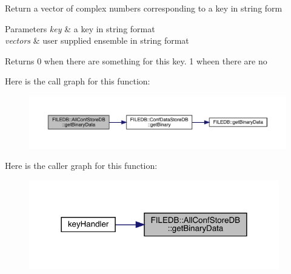 Return a vector of complex numbers corresponding to a key in string form 
\begin{DoxyParams}{Parameters}
{\em key} & a key in string format \\
\hline
{\em vectors} & user supplied ensemble in string format \\
\hline
\end{DoxyParams}
\begin{DoxyReturn}{Returns}
0 when there are something for this key. 1 wheen there are no 
\end{DoxyReturn}
Here is the call graph for this function\+:
\nopagebreak
\begin{figure}[H]
\begin{center}
\leavevmode
\includegraphics[width=350pt]{df/db6/classFILEDB_1_1AllConfStoreDB_aa923faf368f0aa7d327c2a3702d261c1_cgraph}
\end{center}
\end{figure}
Here is the caller graph for this function\+:\nopagebreak
\begin{figure}[H]
\begin{center}
\leavevmode
\includegraphics[width=309pt]{df/db6/classFILEDB_1_1AllConfStoreDB_aa923faf368f0aa7d327c2a3702d261c1_icgraph}
\end{center}
\end{figure}
\mbox{\label{classFILEDB_1_1AllConfStoreDB_a351639b9e19297abfa7b8b1aca013770}} 
